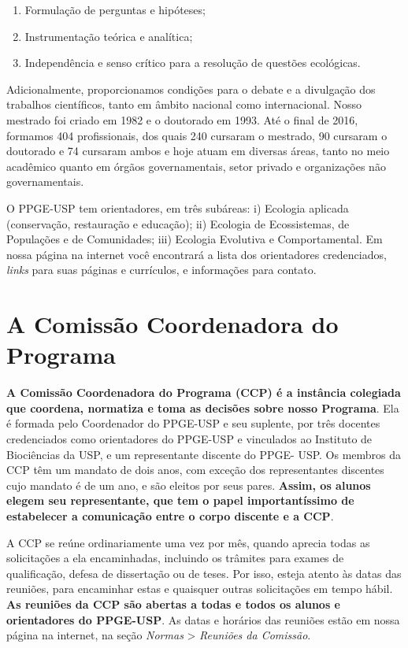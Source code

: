 \documentclass[twoside a4paper 12pt]{report}
\begin{document}
\begin{enumerate}
\item Formulação de perguntas e hipóteses;
\item Instrumentação teórica e analítica;
\item Independência e senso crítico para a resolução de questões ecológicas.
\end{enumerate}

Adicionalmente, proporcionamos condições para o debate e a divulgação
dos trabalhos científicos, tanto em âmbito nacional como internacional.
Nosso mestrado foi criado em 1982 e o doutorado em 1993. Até o final de
2016, formamos 404 profissionais, dos quais 240 cursaram o mestrado, 90
cursaram o doutorado e 74 cursaram ambos e hoje atuam em diversas áreas,
tanto no meio acadêmico quanto em órgãos governamentais, setor privado e
organizações não governamentais.

O PPGE-USP tem orientadores, em três subáreas: i) Ecologia aplicada
(conservação, restauração e educação); ii) Ecologia de Ecossistemas, de
Populações e de Comunidades; iii) Ecologia Evolutiva e Comportamental.
Em nossa página na internet você encontrará a lista dos orientadores
credenciados, \emph{links} para suas páginas e currículos, e informações
para contato.


\section{A Comissão Coordenadora do Programa}
\label{sec:CCP}

\textbf{A Comissão Coordenadora do Programa (CCP) é a instância
colegiada que coordena, normatiza e toma as decisões sobre nosso
Programa}. Ela é formada pelo Coordenador do PPGE-USP e seu suplente,
por três docentes credenciados como orientadores do PPGE-USP e
vinculados ao Instituto de Biociências da USP, e um representante
discente do PPGE- USP. Os membros da CCP têm um mandato de dois anos,
com exceção dos representantes discentes cujo mandato é de um ano, e são
eleitos por seus pares. \textbf{Assim, os alunos elegem seu
representante, que tem o papel importantíssimo de estabelecer a
comunicação entre o corpo discente e a CCP}.

A CCP se reúne ordinariamente uma vez por mês, quando aprecia todas as
solicitações a ela encaminhadas, incluindo os trâmites para exames de
qualificação, defesa de dissertação ou de teses. Por isso, esteja atento
às datas das reuniões, para encaminhar estas e quaisquer outras
solicitações em tempo hábil. \textbf{As reuniões da CCP são abertas a
todas e todos os alunos e orientadores do PPGE-USP}. As datas e horários
das reuniões estão em nossa página na internet, na seção \emph{Normas}
\textgreater{} \emph{Reuniões da Comissão}.
\end{document}
